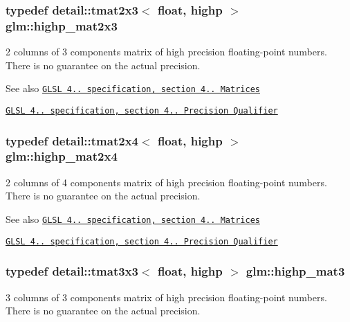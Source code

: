 \subsubsection[{\texorpdfstring{highp\+\_\+mat2x3}{highp_mat2x3}}]{\setlength{\rightskip}{0pt plus 5cm}typedef detail\+::tmat2x3$<$ float, highp $>$ {\bf glm\+::highp\+\_\+mat2x3}}\hypertarget{group__core__precision_ga7d4e5a1c803be5688c75241c924dfa58}{}\label{group__core__precision_ga7d4e5a1c803be5688c75241c924dfa58}
2 columns of 3 components matrix of high precision floating-\/point numbers. There is no guarantee on the actual precision.

\begin{DoxySeeAlso}{See also}
\href{http://www.opengl.org/registry/doc/GLSLangSpec.4.20.8.pdf}{\tt G\+L\+SL 4.. specification, section 4.. Matrices} 

\href{http://www.opengl.org/registry/doc/GLSLangSpec.4.20.8.pdf}{\tt G\+L\+SL 4.. specification, section 4.. Precision Qualifier} 
\end{DoxySeeAlso}
\subsubsection[{\texorpdfstring{highp\+\_\+mat2x4}{highp_mat2x4}}]{\setlength{\rightskip}{0pt plus 5cm}typedef detail\+::tmat2x4$<$ float, highp $>$ {\bf glm\+::highp\+\_\+mat2x4}}\hypertarget{group__core__precision_ga3cc506666b7a95db56f9d2eb787b6e20}{}\label{group__core__precision_ga3cc506666b7a95db56f9d2eb787b6e20}
2 columns of 4 components matrix of high precision floating-\/point numbers. There is no guarantee on the actual precision.

\begin{DoxySeeAlso}{See also}
\href{http://www.opengl.org/registry/doc/GLSLangSpec.4.20.8.pdf}{\tt G\+L\+SL 4.. specification, section 4.. Matrices} 

\href{http://www.opengl.org/registry/doc/GLSLangSpec.4.20.8.pdf}{\tt G\+L\+SL 4.. specification, section 4.. Precision Qualifier} 
\end{DoxySeeAlso}
\subsubsection[{\texorpdfstring{highp\+\_\+mat3}{highp_mat3}}]{\setlength{\rightskip}{0pt plus 5cm}typedef detail\+::tmat3x3$<$ float, highp $>$ {\bf glm\+::highp\+\_\+mat3}}\hypertarget{group__core__precision_ga334034520a655db41a2e188951f6aaad}{}\label{group__core__precision_ga334034520a655db41a2e188951f6aaad}
3 columns of 3 components matrix of high precision floating-\/point numbers. There is no guarantee on the actual precision.

